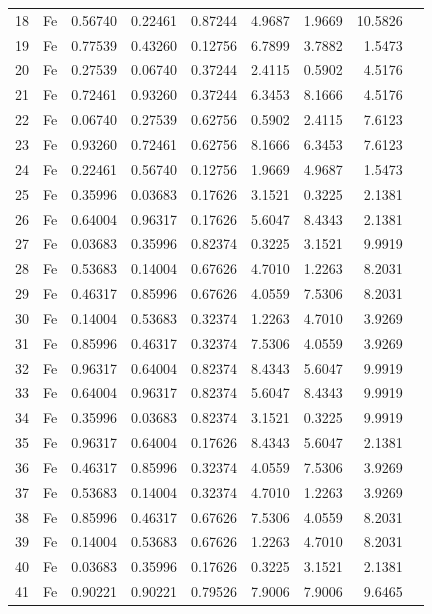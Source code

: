 \begin{longtable}{rlrrrrrrl}
18 & Fe & 0.56740 & 0.22461 & 0.87244 & 4.9687 & 1.9669 & 10.5826 &  \\
19 & Fe & 0.77539 & 0.43260 & 0.12756 & 6.7899 & 3.7882 & 1.5473 &  \\
20 & Fe & 0.27539 & 0.06740 & 0.37244 & 2.4115 & 0.5902 & 4.5176 &  \\
21 & Fe & 0.72461 & 0.93260 & 0.37244 & 6.3453 & 8.1666 & 4.5176 &  \\
22 & Fe & 0.06740 & 0.27539 & 0.62756 & 0.5902 & 2.4115 & 7.6123 &  \\
23 & Fe & 0.93260 & 0.72461 & 0.62756 & 8.1666 & 6.3453 & 7.6123 &  \\
24 & Fe & 0.22461 & 0.56740 & 0.12756 & 1.9669 & 4.9687 & 1.5473 &  \\
25 & Fe & 0.35996 & 0.03683 & 0.17626 & 3.1521 & 0.3225 & 2.1381 &  \\
26 & Fe & 0.64004 & 0.96317 & 0.17626 & 5.6047 & 8.4343 & 2.1381 &  \\
27 & Fe & 0.03683 & 0.35996 & 0.82374 & 0.3225 & 3.1521 & 9.9919 &  \\
28 & Fe & 0.53683 & 0.14004 & 0.67626 & 4.7010 & 1.2263 & 8.2031 &  \\
29 & Fe & 0.46317 & 0.85996 & 0.67626 & 4.0559 & 7.5306 & 8.2031 &  \\
30 & Fe & 0.14004 & 0.53683 & 0.32374 & 1.2263 & 4.7010 & 3.9269 &  \\
31 & Fe & 0.85996 & 0.46317 & 0.32374 & 7.5306 & 4.0559 & 3.9269 &  \\
32 & Fe & 0.96317 & 0.64004 & 0.82374 & 8.4343 & 5.6047 & 9.9919 &  \\
33 & Fe & 0.64004 & 0.96317 & 0.82374 & 5.6047 & 8.4343 & 9.9919 &  \\
34 & Fe & 0.35996 & 0.03683 & 0.82374 & 3.1521 & 0.3225 & 9.9919 &  \\
35 & Fe & 0.96317 & 0.64004 & 0.17626 & 8.4343 & 5.6047 & 2.1381 &  \\
36 & Fe & 0.46317 & 0.85996 & 0.32374 & 4.0559 & 7.5306 & 3.9269 &  \\
37 & Fe & 0.53683 & 0.14004 & 0.32374 & 4.7010 & 1.2263 & 3.9269 &  \\
38 & Fe & 0.85996 & 0.46317 & 0.67626 & 7.5306 & 4.0559 & 8.2031 &  \\
39 & Fe & 0.14004 & 0.53683 & 0.67626 & 1.2263 & 4.7010 & 8.2031 &  \\
40 & Fe & 0.03683 & 0.35996 & 0.17626 & 0.3225 & 3.1521 & 2.1381 &  \\
41 & Fe & 0.90221 & 0.90221 & 0.79526 & 7.9006 & 7.9006 & 9.6465 &  \\

\end{longtable}
